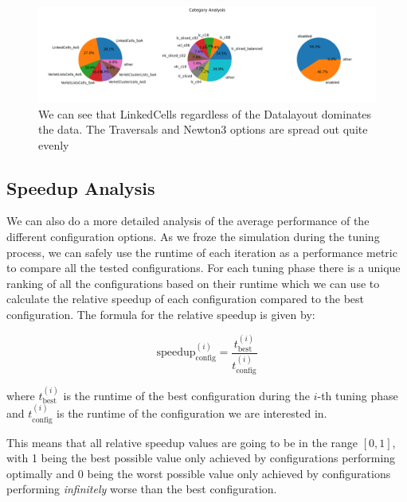 \begin{figure}[H]
    \centering
    \includegraphics[width=\columnwidth,trim={1cm 2cm 2cm 2cm},clip]{figures/DataAnalytics/traversal_pie_chart.png}
    \caption[Pi Charts of nominal values of the collected Dataset]{ We can see that LinkedCells regardless of the Datalayout dominates the data. The Traversals and Newton3 options are spread out quite evenly}
    \label{fig:inputAnalysisPiChart}
\end{figure}

\subsection{Speedup Analysis}

We can also do a more detailed analysis of the average performance of the different configuration options. As we froze the simulation during the tuning process, we can safely use the runtime of each iteration as a performance metric to compare all the tested configurations. For each tuning phase there is a unique ranking of all the configurations based on their runtime which we can use to calculate the relative speedup of each configuration compared to the best configuration. The formula for the relative speedup is given by:

\begin{equation}
    {\text{speedup}^{(i)}_{\text{config}}}= \frac{t_{\text{best}}^{(i)}}{t_{\text{config}}^{(i)}}
\end{equation}

where $t_{\text{best}}^{(i)}$ is the runtime of the best configuration during the $i$-th tuning phase and $t_{\text{config}}^{(i)}$ is the runtime of the configuration we are interested in.

This means that all relative speedup values are going to be in the range $[0,1]$, with 1 being the best possible value only achieved by configurations performing optimally and 0 being the worst possible value only achieved by configurations performing \emph{infinitely} worse than the best configuration.

